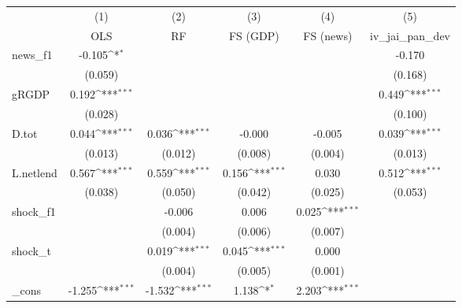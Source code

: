 {
\def\sym#1{\ifmmode^{#1}\else\(^{#1}\)\fi}
\begin{tabular}{l*{5}{c}}
\toprule
            &\multicolumn{1}{c}{(1)}&\multicolumn{1}{c}{(2)}&\multicolumn{1}{c}{(3)}&\multicolumn{1}{c}{(4)}&\multicolumn{1}{c}{(5)}\\
            &\multicolumn{1}{c}{OLS}&\multicolumn{1}{c}{RF}&\multicolumn{1}{c}{FS (GDP)}&\multicolumn{1}{c}{FS (news)}&\multicolumn{1}{c}{iv\_jai\_pan\_dev}\\
\midrule
news\_f1     &      -0.105\sym{*}  &                     &                     &                     &      -0.170         \\
            &     (0.059)         &                     &                     &                     &     (0.168)         \\
\addlinespace
gRGDP       &       0.192\sym{***}&                     &                     &                     &       0.449\sym{***}\\
            &     (0.028)         &                     &                     &                     &     (0.100)         \\
\addlinespace
D.tot       &       0.044\sym{***}&       0.036\sym{***}&      -0.000         &      -0.005         &       0.039\sym{***}\\
            &     (0.013)         &     (0.012)         &     (0.008)         &     (0.004)         &     (0.013)         \\
\addlinespace
L.netlend   &       0.567\sym{***}&       0.559\sym{***}&       0.156\sym{***}&       0.030         &       0.512\sym{***}\\
            &     (0.038)         &     (0.050)         &     (0.042)         &     (0.025)         &     (0.053)         \\
\addlinespace
shock\_f1    &                     &      -0.006         &       0.006         &       0.025\sym{***}&                     \\
            &                     &     (0.004)         &     (0.006)         &     (0.007)         &                     \\
\addlinespace
shock\_t     &                     &       0.019\sym{***}&       0.045\sym{***}&       0.000         &                     \\
            &                     &     (0.004)         &     (0.005)         &     (0.001)         &                     \\
\addlinespace
\_cons      &      -1.255\sym{***}&      -1.532\sym{***}&       1.138\sym{*}  &       2.203\sym{***}&                     \\

\end{tabular}}
